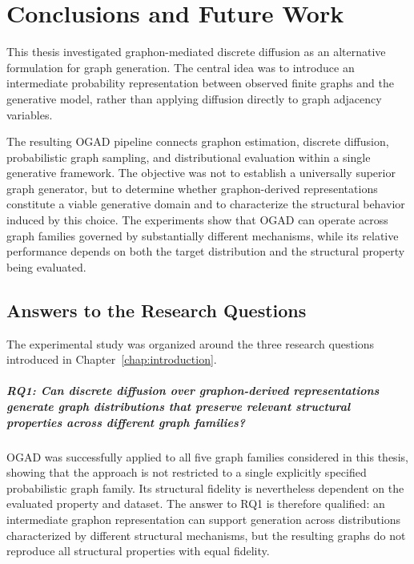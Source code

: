 \chapter{Conclusions and Future Work}
\label{chap:conclusions}

This thesis investigated graphon-mediated discrete diffusion as an alternative formulation for graph generation. The central idea was to introduce an intermediate probability representation between observed finite graphs and the generative model, rather than applying diffusion directly to graph adjacency variables.

The resulting OGAD pipeline connects graphon estimation, discrete diffusion, probabilistic graph sampling, and distributional evaluation within a single generative framework. The objective was not to establish a universally superior graph generator, but to determine whether graphon-derived representations constitute a viable generative domain and to characterize the structural behavior induced by this choice. The experiments show that OGAD can operate across graph families governed by substantially different mechanisms, while its relative performance depends on both the target distribution and the structural property being evaluated.


\section{Answers to the Research Questions}
\label{sec:conclusions_rq}

The experimental study was organized around the three research questions introduced in Chapter~\ref{chap:introduction}.

\paragraph{RQ1: Can discrete diffusion over graphon-derived representations generate graph distributions that preserve relevant structural properties across different graph families?}

OGAD was successfully applied to all five graph families considered in this thesis, showing that the approach is not restricted to a single explicitly specified probabilistic graph family. Its structural fidelity is nevertheless dependent on the evaluated property and dataset. The answer to RQ1 is therefore qualified: an intermediate graphon representation can support generation across distributions characterized by different structural mechanisms, but the resulting graphs do not reproduce all structural properties with equal fidelity.

